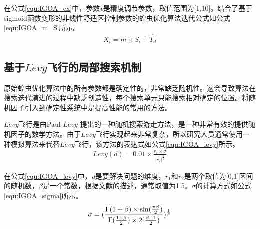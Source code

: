 在公式\ref{equ:IGOA_cx}中，参数\emph{v}是精度调节参数，取值范围为[1,10]。结合了基于sigmoid函数变形的非线性舒适区控制参数的蝗虫优化算法迭代公式如公式\ref{equ:IGOA_m_S}所示。
\begin{eqnarray}\label{equ:IGOA_m_S}
	X_i = m\times S_i + \widehat{T_d}
\end{eqnarray}
\subsection{基于$L\acute{e}vy$飞行的局部搜索机制}

原始蝗虫优化算法中的所有参数都是确定性的，非常缺乏随机性。这会导致算法在搜索迭代演进的过程中缺乏创造性，每个搜索单元只能搜索相对确定的位置。将随机因子引入到确定性系统中是提高性能的常用的方法。

$L\acute{e}vy$飞行是由Paul $L\acute{e}vy$ \cite {mirjalili2016dragonfly}提出的一种随机搜索游走方法，是一种非常有效的提供随机因子的数学方法。由于$L\acute{e}vy$飞行实现起来非常复杂，所以研究人员通常使用一种模拟算法来代替$L\acute{e}vy$飞行，该方法的表达式如公式\ref{equ:IGOA_levy}所示。
\begin{eqnarray}\label{equ:IGOA_levy}
	Levy(d)=0.01\times\frac{r_1\times\sigma}{|r_2|^{\frac{1}{\beta}}}
\end{eqnarray}

在公式\ref{equ:IGOA_levy}中，\emph{d}是要解决问题的维度，$r_1$和$r_2$是两个取值为[0,1]区间的随机数，$\beta$是一个常数，根据文献\cite{mirjalili2016dragonfly}的描述，通常取值为1.5。$\sigma$的计算方式如公式\ref{equ:IGOA_sigma}所示。
\begin{eqnarray}\label{equ:IGOA_sigma}
	\sigma=(\frac{\Gamma(1+\beta)\times \sin(\frac{\pi\beta}{2})}{\Gamma(\frac{1+\beta}{2})\time\beta\times2^(\frac{\beta-1}{2})})^\frac{1}{\beta}
\end{eqnarray}

